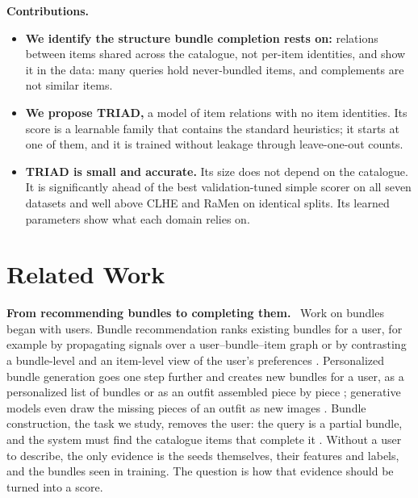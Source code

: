 \documentclass[runningheads]{llncs}
\renewcommand{\paragraph}[1]{\smallskip\noindent\textbf{#1}\ }
\begin{document}
\paragraph{Contributions.}
\begin{itemize}
\item \textbf{We identify the structure bundle completion rests on:} relations between items shared across the
catalogue, not per-item identities, and show it in the data: many queries hold never-bundled items, and complements are
not similar items.
\item \textbf{We propose TRIAD,} a model of item relations with no item identities. Its score is a learnable family
that contains the standard heuristics; it starts at one of them, and it is trained without leakage through
leave-one-out counts.
\item \textbf{TRIAD is small and accurate.} Its size does not depend on the catalogue. It is significantly ahead of
the best validation-tuned simple scorer on all seven datasets and well above CLHE and RaMen on identical splits. Its
learned parameters show what each domain relies on.
\end{itemize}

\section{Related Work}
\label{sec:related}

\paragraph{From recommending bundles to completing them.} Work on bundles began with users. Bundle recommendation
ranks existing bundles for a user, for example by propagating signals over a user--bundle--item graph \cite{bgcn} or
by contrasting a bundle-level and an item-level view of the user's preferences \cite{crosscbr}. Personalized bundle
generation goes one step further and creates new bundles for a user, as a personalized list of bundles \cite{bgn} or as
an outfit assembled piece by piece \cite{pog}; generative models even draw the missing pieces of an outfit as new
images \cite{fashiondpo}. Bundle construction, the task we study, removes the user: the query is a partial bundle, and
the system must find the catalogue items that complete it \cite{clhe}. Without a user to describe, the
only evidence is the seeds themselves, their features and labels, and the bundles seen in training. The question is
how that evidence should be turned into a score.
\end{document}
